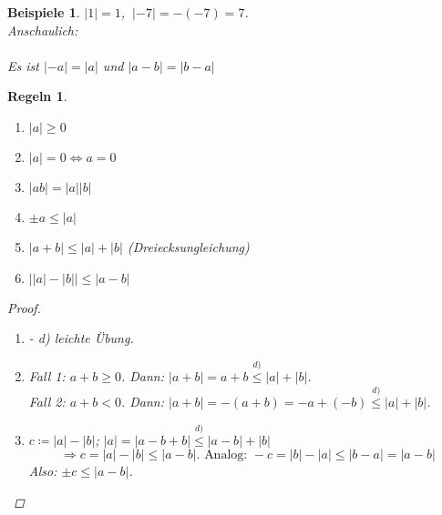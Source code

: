 \documentclass[14pt,titlepage,ngerman,a4paper,headsepline,DIV15,halfparskip*]{scrartcl}
\theoremstyle{named}
\theoremstyle{dotless}
\newtheorem*{beispiele}{Beispiele}
\newtheorem*{regeln}{Regeln}
\begin{document}
\begin{beispiele}
	$|1| = 1$, $~|-7| = -(-7) = 7$. \\
		Anschaulich:   \\ \\
	Es ist $|-a| = |a|$ und $|a - b| = |b - a|$
\end{beispiele}


\begin{regeln} ~\
	\begin{enumerate}
		\item $|a| \geq 0$
		\item $|a| = 0 \iff a = 0$
		\item $|ab| = |a||b|$
		\item $\pm a \leq |a|$
		\item $|a + b| \leq |a| + |b|$ (Dreiecksungleichung)
		\item $\left| |a| - |b| \right| \leq |a - b|$
	\end{enumerate}	

	\begin{proof} ~\
	  \begin{enumerate}
		\item[a)]- d) leichte Übung.
		\item[e)] Fall 1: $a +b \geq 0$. Dann: $|a + b| = a + b \overset{d)}{\leq} |a| + |b|$. \\
			Fall 2: $a + b < 0$. Dann: $|a + b| = - (a + b) = - a + (- b) \overset{d)}{\leq} |a| + |b|$.
		\item[f)] $c \coloneqq |a| - |b|$; $|a| = |a - b + b| \overset{d)}{\leq} |a - b | + |b|$
			$$
				\Rightarrow c = |a| - |b| \leq |a - b|. \text{ Analog: } -c = |b| - |a| \leq |b - a| = |a - b| 
			$$
			Also: $\pm c \leq |a - b|$.
	  \end{enumerate}
	\end{proof}
\end{regeln}
\end{document}
